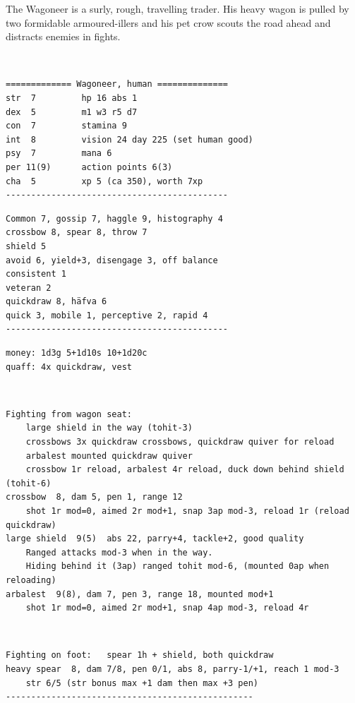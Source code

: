The Wagoneer is a surly, rough, travelling trader. His heavy wagon is pulled by two formidable armoured-illers and his pet crow scouts the road ahead and distracts enemies in fights.

\

\small \begin{samepage} \begin{verbatim}
============= Wagoneer, human ==============
str  7         hp 16 abs 1
dex  5         m1 w3 r5 d7
con  7         stamina 9
int  8         vision 24 day 225 (set human good)
psy  7         mana 6
per 11(9)      action points 6(3)
cha  5         xp 5 (ca 350), worth 7xp
--------------------------------------------
\end{verbatim} \goodbreak \begin{verbatim}
Common 7, gossip 7, haggle 9, histography 4
crossbow 8, spear 8, throw 7
shield 5
avoid 6, yield+3, disengage 3, off balance
consistent 1
veteran 2
quickdraw 8, häfva 6
quick 3, mobile 1, perceptive 2, rapid 4
--------------------------------------------
\end{verbatim} \goodbreak \begin{verbatim}
money: 1d3g 5+1d10s 10+1d20c
quaff: 4x quickdraw, vest
\end{verbatim} \end{samepage}   \   \goodbreak \begin{samepage} \begin{verbatim}
Fighting from wagon seat:
    large shield in the way (tohit-3)
    crossbows 3x quickdraw crossbows, quickdraw quiver for reload
    arbalest mounted quickdraw quiver
    crossbow 1r reload, arbalest 4r reload, duck down behind shield (tohit-6)
crossbow  8, dam 5, pen 1, range 12
    shot 1r mod=0, aimed 2r mod+1, snap 3ap mod-3, reload 1r (reload quickdraw)
large shield  9(5)  abs 22, parry+4, tackle+2, good quality
    Ranged attacks mod-3 when in the way.
    Hiding behind it (3ap) ranged tohit mod-6, (mounted 0ap when reloading)
arbalest  9(8), dam 7, pen 3, range 18, mounted mod+1
    shot 1r mod=0, aimed 2r mod+1, snap 4ap mod-3, reload 4r
\end{verbatim} \end{samepage}   \   \goodbreak \begin{samepage} \begin{verbatim}
Fighting on foot:   spear 1h + shield, both quickdraw
heavy spear  8, dam 7/8, pen 0/1, abs 8, parry-1/+1, reach 1 mod-3
    str 6/5 (str bonus max +1 dam then max +3 pen)
-------------------------------------------------
\end{verbatim} \end{samepage} \normalsize

